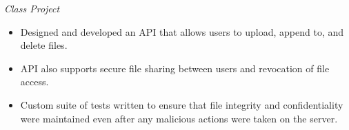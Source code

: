 \documentclass{article}
\begin{document}
\begin{adjustwidth}{1em}{1em}
    \textit{Class Project}
    \begin{itemize}
        \item Designed and developed an API that allows users to upload, append to, and delete files.
        \item API also supports secure file sharing between users and revocation of file access.
        \item Custom suite of tests written to ensure that file integrity and confidentiality were maintained even after any malicious actions were taken on the server.
    \end{itemize}

    \vspace{1mm}




    


\end{adjustwidth}
\end{document}
